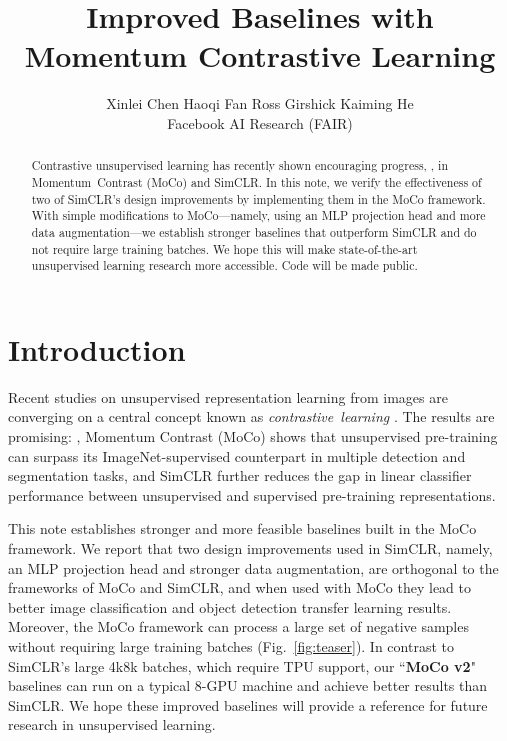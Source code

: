 \documentclass[10pt,twocolumn,letterpaper]{article}
\begin{document}
\title{\vspace{-1em} Improved Baselines with Momentum Contrastive Learning \vspace{-.5em}}

\author{
Xinlei Chen \quad Haoqi Fan \quad Ross Girshick  \quad Kaiming He \vspace{.3em} \\
Facebook AI Research (FAIR)
\vspace{-.5em}
}

\maketitle


\begin{abstract}
\vspace{-.5em}
Contrastive unsupervised learning has recently shown encouraging progress, \eg, in Momentum~Contrast (MoCo) and SimCLR.
In this note, we verify the effectiveness of two of SimCLR's design improvements by implementing them in the MoCo framework.
With simple modifications to MoCo---namely, using an MLP projection head and more data augmentation---we establish stronger baselines that outperform SimCLR and do not require large training batches. We hope this will make state-of-the-art unsupervised learning research more accessible. Code will be made public.

\vspace{-.5em}
\end{abstract}

\section{Introduction}

Recent studies on unsupervised representation learning from images \cite{Wu2018a,Oord2018,Hjelm2019,Ye2019,Bachman2019,Henaff2019,Tian2019,He2019a,Misra2019,Chen2020} are converging on a central concept known as \emph{\mbox{contrastive learning}} \cite{Hadsell2006}. The results are promising: \eg, Momentum Contrast (MoCo) \cite{He2019a} shows that unsupervised pre-training can surpass its ImageNet-supervised counterpart in multiple detection and segmentation tasks, and SimCLR \cite{Chen2020} further reduces the gap in linear classifier performance between \mbox{unsupervised} and supervised pre-training representations.

This note establishes stronger and more feasible baselines built in the MoCo framework. We report that two design improvements used in SimCLR, namely, an MLP projection head and stronger data augmentation, are orthogonal to the frameworks of MoCo and SimCLR, and when used with MoCo they lead to better image classification and object detection transfer learning results.
Moreover, the MoCo framework can process a large set of negative samples \mbox{without} requiring large training batches (Fig.~\ref{fig:teaser}). In contrast to SimCLR's large 4k8k batches, which require TPU support, our ``\textbf{MoCo v2}" baselines can run on a typical 8-GPU machine and achieve better results than SimCLR. 
We hope these improved baselines will provide a reference for future research in unsupervised learning.
\end{document}
